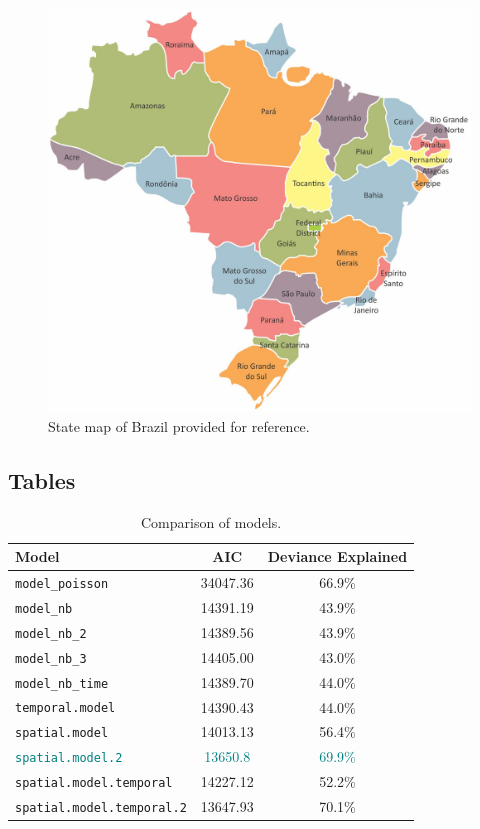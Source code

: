 \begin{figure}[H]
\centering
\includegraphics[scale=0.5]{brazil-division-states.jpg}
\caption{\label{fig:brazil-division-states}State map of Brazil provided for reference.}
\end{figure}


\subsection{Tables}

\begin{table}[H]
\centering
\begin{tabular}{l|c|c}
Model & AIC & Deviance Explained\\\hline
\texttt{model\_poisson} & 34047.36 & 66.9\%\\
\texttt{model\_nb} & 14391.19 & 43.9\%\\
\texttt{model\_nb\_2} & 14389.56 & 43.9\%\\
\texttt{model\_nb\_3} & 14405.00 & 43.0\%\\
\texttt{model\_nb\_time} & 14389.70 & 44.0\%\\
\texttt{temporal.model} & 14390.43 & 44.0\%\\
\texttt{spatial.model} & 14013.13 & 56.4\%\\
\textcolor{teal}{\texttt{spatial.model.2}} & \textcolor{teal}{13650.8} & \textcolor{teal}{69.9\%}\\
\texttt{spatial.model.temporal} & 14227.12 & 52.2\%\\
\texttt{spatial.model.temporal.2} & 13647.93 & 70.1\%
\end{tabular}
\caption{\label{tab:metrics}Comparison of models.}
\end{table}

